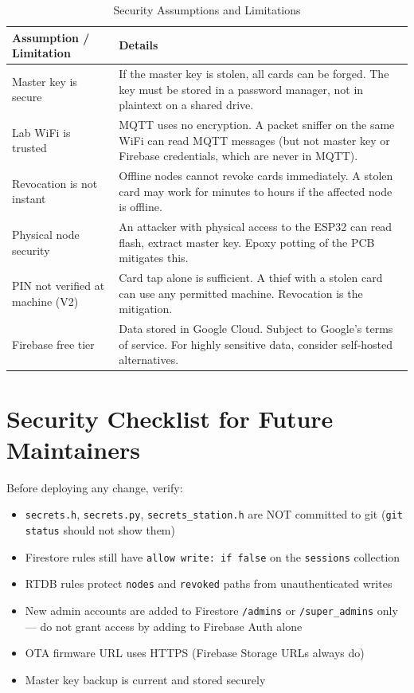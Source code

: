 \begin{table}[H]
\centering
\caption{Security Assumptions and Limitations}
\begin{tabular}{L{5cm}L{9cm}}
\toprule
\textbf{Assumption / Limitation} & \textbf{Details} \\
\midrule
Master key is secure & If the master key is stolen, all cards can be forged. The key must be stored in a password manager, not in plaintext on a shared drive. \\
Lab WiFi is trusted & MQTT uses no encryption. A packet sniffer on the same WiFi can read MQTT messages (but not master key or Firebase credentials, which are never in MQTT). \\
Revocation is not instant & Offline nodes cannot revoke cards immediately. A stolen card may work for minutes to hours if the affected node is offline. \\
Physical node security & An attacker with physical access to the ESP32 can read flash, extract master key. Epoxy potting of the PCB mitigates this. \\
PIN not verified at machine (V2) & Card tap alone is sufficient. A thief with a stolen card can use any permitted machine. Revocation is the mitigation. \\
Firebase free tier & Data stored in Google Cloud. Subject to Google's terms of service. For highly sensitive data, consider self-hosted alternatives. \\
\bottomrule
\end{tabular}
\end{table}

\section{Security Checklist for Future Maintainers}

Before deploying any change, verify:
\begin{itemize}[leftmargin=1.5em]
    \item \texttt{secrets.h}, \texttt{secrets.py}, \texttt{secrets\_station.h} are NOT committed to git (\texttt{git status} should not show them)
    \item Firestore rules still have \texttt{allow write: if false} on the \texttt{sessions} collection
    \item RTDB rules protect \texttt{nodes} and \texttt{revoked} paths from unauthenticated writes
    \item New admin accounts are added to Firestore \texttt{/admins} or \texttt{/super\_admins} only --- do not grant access by adding to Firebase Auth alone
    \item OTA firmware URL uses HTTPS (Firebase Storage URLs always do)
    \item Master key backup is current and stored securely
\end{itemize}
